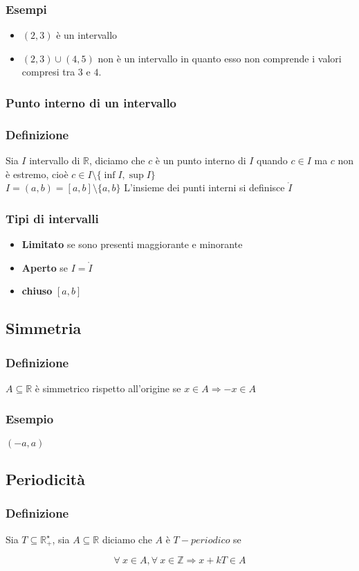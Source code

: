 \subsubsection*{Esempi}
\begin{itemize}
    \item $(2,3)$ è un intervallo
    \item $(2,3) \cup (4,5)$ non è un intervallo in quanto esso non comprende i valori compresi tra $3$ e $4$.
\end{itemize}
\subsubsection{Punto interno di un intervallo}
\subsubsection*{Definizione}
Sia $I$ intervallo di $\mathbb{R}$, diciamo che $c$ è un punto interno di $I$ quando $c \in I$ ma $c$ non è estremo,
cioè $c \in I \setminus \{\inf{I}, \sup{I}\}$\\
$I = (a,b)=[a,b]\setminus\{a,b\}$
L'insieme dei punti interni si definisce $\mathring{I}$
\subsubsection{Tipi di intervalli}
\begin{itemize}
    \item \textbf{Limitato} se sono presenti maggiorante e minorante
    \item \textbf{Aperto} se $I = \mathring{I}$
    \item \textbf{chiuso} $[a,b]$ 
\end{itemize}
\subsection{Simmetria}
\subsubsection*{Definizione}
$A \subseteq \mathbb{R}$ è simmetrico rispetto all'origine se $x \in A \Rightarrow -x \in A$
\subsubsection*{Esempio}
$(-a,a)$
\subsection{Periodicità}
\subsubsection*{Definizione}
Sia $T \subseteq \mathbb{R}_{+}^{\star}$, sia $A \subseteq \mathbb{R}$ diciamo che $A$ è $T-periodico$ se\\
\begin{Large}
    \begin{equation*}
        \forall\ x \in A, \forall\ x \in \mathbb{Z} \Rightarrow x + kT \in A
    \end{equation*}
\end{Large}
